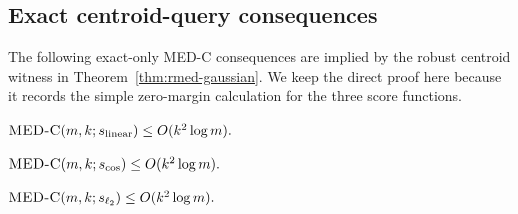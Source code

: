 \documentclass{article}
\begin{document}
\subsection{Exact centroid-query consequences}\label{app:medc-consequences}

The following exact-only MED-C consequences are implied by the robust centroid witness in Theorem~\ref{thm:rmed-gaussian}. We keep the direct proof here because it records the simple zero-margin calculation for the three score functions.

\begin{theorem}\label{thm:medc-linear}
    $\textsc{MED-C}(m, k; s_{\rm linear})\leq O(k^2\log m).$
\end{theorem}
\begin{theorem}\label{thm:medc-cos}
    $\textsc{MED-C}(m, k; s_{\cos})\leq O(k^2\log m).$
\end{theorem}
\begin{theorem}\label{thm:medc-l2}
    $\textsc{MED-C}(m, k; s_{\ell_2})\leq O(k^2\log m).$
\end{theorem}
\end{document}
